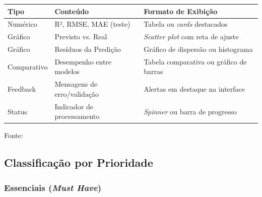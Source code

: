 \begin{quadro}[ht]
\begin{center}
\small
\captionsetup{justification=centering, labelsep=endash, width=0.75\linewidth}
\caption{Saídas esperadas do sistema}
\label{quadro:saidas}
\begin{threeparttable}
\begin{tabularx}{\textwidth}{|l|l|X|} \hline
\textbf{Tipo} & \textbf{Conteúdo} & \textbf{Formato de Exibição} \\ \hline
Numérico & R², RMSE, MAE (teste) & Tabela ou \textit{cards} destacados \\ \hline
Gráfico & Previsto vs. Real & \textit{Scatter plot} com reta de ajuste \\ \hline
Gráfico & Resíduos da Predição & Gráfico de dispersão ou histograma \\ \hline
Comparativo & Desempenho entre modelos & Tabela comparativa ou gráfico de barras \\ \hline
Feedback & Mensagens de erro/validação & Alertas em destaque na interface \\ \hline
Status & Indicador de processamento & \textit{Spinner} ou barra de progresso \\ \hline
\end{tabularx}
\begin{tablenotes}[flushleft]
\footnotesize
\item Fonte:~\oautor
\end{tablenotes}
\end{threeparttable}
\end{center}
\end{quadro}

\newpage

\subsection{Classificação por Prioridade}
\label{subsec:prioridade}

\subsubsection{Essenciais (\textit{Must Have})}
\label{ssubsec:essenciais}

